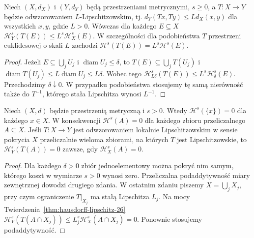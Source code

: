 \begin{twierdzenie}
\label{thm:hausdorff-lipschitz-26}
Niech $(X,d_X)$ i $(Y,d_Y)$ będą przestrzeniami
metrycznymi, $s\ge0$, a $T:X\to Y$ będzie
odwzorowaniem $L$-Lipschitzowskim, tj.
$d_Y(Tx,Ty)\le Ld_X(x,y)$ dla wszystkich $x,y$,
gdzie $L>0$. Wówczas dla każdego $E\subseteq X$
$\mathcal H_Y^s(T(E))\le L^s\mathcal H_X^s(E)$.
W szczególności dla podobieństwa $T$ przestrzeni
euklidesowej o skali $L$ zachodzi
$\mathcal H^s(T(E))=L^s\mathcal H^s(E)$.
\end{twierdzenie}
\begin{proof}
Jeżeli $E\subseteq\bigcup_jU_j$ i
$\operatorname{diam}U_j\le\delta$, to
$T(E)\subseteq\bigcup_jT(U_j)$ i
$\operatorname{diam}T(U_j)\le L\operatorname{diam}U_j
\le L\delta$. Wobec tego
$\mathcal H^s_{L\delta}(T(E))\le
L^s\mathcal H^s_\delta(E)$.
Przechodzimy $\delta\downarrow0$. W przypadku
podobieństwa stosujemy tę samą nierówność także do
$T^{-1}$, którego stała Lipschitza wynosi $L^{-1}$.
\end{proof}

\begin{wniosek}
\label{cor:hausdorff-singletons-auditVI}
Niech $(X,d)$ będzie przestrzenią metryczną i $s>0$.
Wtedy $\mathcal H^s(\{x\})=0$ dla każdego $x\in X$.
W konsekwencji $\mathcal H^s(A)=0$ dla każdego zbioru
przeliczalnego $A\subseteq X$. Jeśli $T:X\to Y$ jest
odwzorowaniem lokalnie Lipschitzowskim w sensie pokrycia
$X$ przeliczalnie wieloma zbiorami, na których $T$
jest Lipschitzowskie, to
$\mathcal H_Y^s(T(A))=0$ zawsze, gdy $\mathcal H_X^s(A)=0$.
\end{wniosek}
\begin{proof}
Dla każdego $\delta>0$ zbiór jednoelementowy
można pokryć nim samym, którego koszt w wymiarze
$s>0$ wynosi zero. Przeliczalna podaddytywność
miary zewnętrznej dowodzi drugiego zdania.
W ostatnim zdaniu piszemy $X=\bigcup_jX_j$,
przy czym ograniczenie $T|_{X_j}$ ma stałą
Lipschitza $L_j$. Na mocy
Twierdzenia~\ref{thm:hausdorff-lipschitz-26}
$\mathcal H_Y^s(T(A\cap X_j))\le
L_j^s\mathcal H_X^s(A\cap X_j)=0$.
Ponownie stosujemy podaddytywność.
\end{proof}

